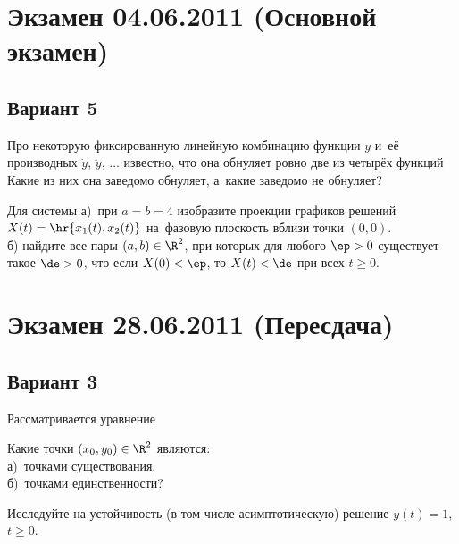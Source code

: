 \documentclass{article}
\begin{document}
\section{Экзамен 04.06.2011 (Основной экзамен)}
\setcounter{problem}{0}

\subsection{Вариант 5}

\begin{problem}[3 балла]
Про некоторую фиксированную линейную комбинацию
функции $y$ и~её производных $\dot y$, $\ddot y$, $\ldots$
известно, что она обнуляет ровно две из четырёх функций
Какие из них она заведомо обнуляет, а~какие заведомо не обнуляет?
\end{problem}

\begin{problem}[2+5 баллов]
Для системы
а)~при $a=b=4$ изобразите проекции графиков решений $X(t)=\hr{x_1(t), x_2(t)}$ на~фазовую плоскость
вблизи точки $(0,0)$.\\
б) найдите все пары $(a,b)\in \R^2$, при которых для любого $\ep>0$ существует такое $\de>0$,
что если $X(0)<\ep$, то $X(t)<\de$ при всех $t\ge 0$.
\end{problem}

\section{Экзамен 28.06.2011 (Пересдача)}

\subsection{Вариант 3}

Рассматривается уравнение
\begin{problem}[1+2 балла]
Какие точки $(x_0,y_0)\in \R^2$ являются:\\
а)~точками существования,\\
б)~точками единственности?
\end{problem}

\begin{problem}[2~балла]
Исследуйте на устойчивость (в том числе асимптотическую) решение $y(t)=1$, $t\ge 0$.
\end{problem}
\end{document}
